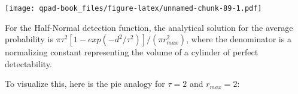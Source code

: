 \documentclass[12pt,]{book}
\newenvironment{Shaded}{\begin{snugshade}}{\end{snugshade}}
\newcommand{\ControlFlowTok}[1]{\textcolor[rgb]{0.13,0.29,0.53}{\textbf{#1}}}
\newcommand{\DataTypeTok}[1]{\textcolor[rgb]{0.13,0.29,0.53}{#1}}
\newcommand{\DecValTok}[1]{\textcolor[rgb]{0.00,0.00,0.81}{#1}}
\newcommand{\KeywordTok}[1]{\textcolor[rgb]{0.13,0.29,0.53}{\textbf{#1}}}
\newcommand{\NormalTok}[1]{#1}
\newcommand{\OperatorTok}[1]{\textcolor[rgb]{0.81,0.36,0.00}{\textbf{#1}}}
\newcommand{\StringTok}[1]{\textcolor[rgb]{0.31,0.60,0.02}{#1}}
\begin{document}
\begin{Shaded}
\end{Shaded}

\texttt{[image: qpad-book\_files/figure-latex/unnamed-chunk-89-1.pdf]}

For the Half-Normal detection function, the analytical solution for the
average probability is
\(\pi \tau^2 [1-exp(-d^2/\tau^2)] / (\pi r_{max}^2)\),
where the denominator is a normalizing constant
representing the volume of a cylinder of perfect detectability.

To visualize this, here is the pie analogy for
\(\tau=2\) and \(r_{max}=2\):
\end{document}
